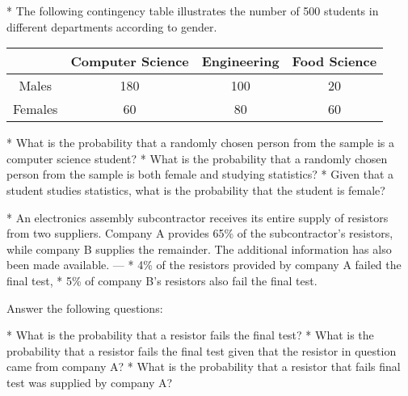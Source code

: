 
* The following contingency table illustrates the number of 500 students in different
departments according to gender.

\begin{center}
\begin{tabular}{|c|c|c|c|}
  \hline
   & Computer Science & Engineering & Food Science \\\hline
  Males & 180 & 100 & 20  \\  \hline
  Females & 60 & 80 & 60  \\ \hline

  \hline
\end{tabular}
\end{center}

\begin{enumerate}[(i)]
*  What is the probability that a randomly chosen person from the sample is a
computer science student?
*  What is the probability that a randomly chosen person from the sample is both female and studying statistics?
*  Given that a student studies statistics, what is the probability that the student is female?
\end{enumerate}


    * 
An electronics assembly subcontractor receives its entire supply of resistors from two suppliers. Company A provides 65\% of the subcontractor's resistors, while company B supplies the remainder. The additional information has also been made available.
--- 
* 4\% of the resistors provided by company A failed the final test,
* 5\% of company B's resistors also fail the final test.

\noindent Answer the following questions:
\begin{enumerate}[(a)]
* What is the probability that a resistor fails the final test?
*  What is the probability that a resistor fails the final test given that the resistor in question came from company A?
*  What is the probability that a resistor that fails final test was supplied by company A?
\end{enumerate}
